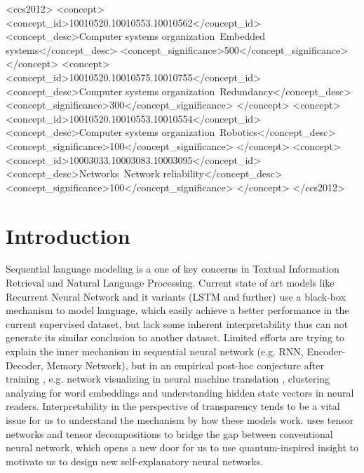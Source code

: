 \documentclass{sig-alternate-05-2015}
\begin{document}
%
%
\begin{CCSXML}
<ccs2012>
 <concept>
  <concept_id>10010520.10010553.10010562</concept_id>
  <concept_desc>Computer systems organization~Embedded systems</concept_desc>
  <concept_significance>500</concept_significance>
 </concept>
 <concept>
  <concept_id>10010520.10010575.10010755</concept_id>
  <concept_desc>Computer systems organization~Redundancy</concept_desc>
  <concept_significance>300</concept_significance>
 </concept>
 <concept>
  <concept_id>10010520.10010553.10010554</concept_id>
  <concept_desc>Computer systems organization~Robotics</concept_desc>
  <concept_significance>100</concept_significance>
 </concept>
 <concept>
  <concept_id>10003033.10003083.10003095</concept_id>
  <concept_desc>Networks~Network reliability</concept_desc>
  <concept_significance>100</concept_significance>
 </concept>
</ccs2012>  
\end{CCSXML}



%
%

%
%
\printccsdesc



\section{Introduction}


Sequential language modeling is a one of key concerns in Textual Information Retrieval and Natural Language Processing. Current state of art models like Recurrent Neural Network and it variants (LSTM and further) use a black-box  mechanism to model language, which easily achieve  a better performance in the current supervised dataset, but lack some inherent interpretability thus can not generate its similar conclusion to another dataset. Limited efforts  are trying to explain the inner mechanism in sequential neural network (e.g. RNN, Encoder-Decoder, Memory Network), but in an empirical post-hoc conjecture after training \cite{lipton2016mythos}, e.g. network visualizing in neural machine translation \cite{ding2017visualizing},  clustering analyzing for word embeddings \cite{trost2017parameter} and understanding hidden state vectors in neural readers\cite{wang2017emergent}. Interpretability in the perspective of transparency tends to be a vital issue for us to understand the mechanism by how these models work.  \cite{levine2017deep} uses tensor networks and tensor decompositions to bridge the gap between conventional neural network, which opens a new door for us to use quantum-inspired insight to motivate us to design new self-explanatory neural networks.
\end{document}
